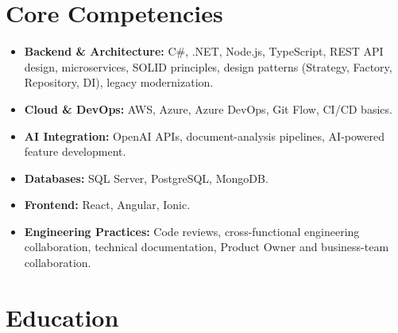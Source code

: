 \documentclass[11pt,a4paper,sans]{moderncv}
\begin{document}
\section{Core Competencies}
\vspace{1pt}
\begin{itemize}
\item \textbf{Backend \& Architecture:} C\#, .NET, Node.js, TypeScript, REST API design, microservices,
SOLID principles, design patterns (Strategy, Factory, Repository, DI), legacy modernization.
\item \textbf{Cloud \& DevOps:} AWS, Azure, Azure DevOps, Git Flow, CI/CD basics.
\item \textbf{AI Integration:} OpenAI APIs, document-analysis pipelines, AI-powered feature development.
\item \textbf{Databases:} SQL Server, PostgreSQL, MongoDB.
\item \textbf{Frontend:} React, Angular, Ionic.
\item \textbf{Engineering Practices:} Code reviews, cross-functional engineering collaboration, technical
documentation, Product Owner and business-team collaboration.
\end{itemize}

\section{Education}
\vspace{1pt}


\vspace{3pt}

\vspace{3pt}
\end{document}
